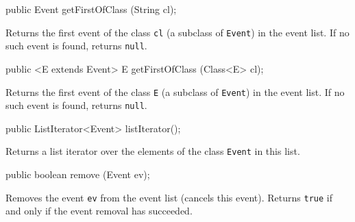 \begin{htmlonly}
\end{htmlonly}
\begin{code}

   public Event getFirstOfClass (String cl);
\end{code}
 \begin{tabb} Returns the first event of the class {\tt cl} (a subclass of
  {\tt Event}) in the event list.  If no such event is found, returns
  {\tt null}.
 \end{tabb}
\begin{htmlonly}
\end{htmlonly}
\begin{code}

   public <E extends Event> E getFirstOfClass (Class<E> cl);
\end{code}
 \begin{tabb} Returns the first event of the class {\tt E} (a subclass of
  {\tt Event}) in the event list. If no such event is found, returns
  {\tt null}.
 \end{tabb}
\begin{htmlonly}
\end{htmlonly}
\begin{code}

   public ListIterator<Event> listIterator();
\end{code}
\begin{tabb}
   Returns a list iterator over the elements of the class {\tt Event} in this list.
\end{tabb}
\begin{htmlonly}
\end{htmlonly}
\begin{code}

   public boolean remove (Event ev);
\end{code}
 \begin{tabb}  Removes the event {\tt ev} from the event list (cancels this event).
 Returns {\tt true} if and only if the event removal has succeeded.
 \end{tabb}
\begin{htmlonly}
\end{htmlonly}
